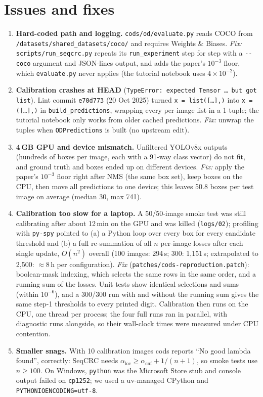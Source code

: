 \documentclass[10pt]{article}
\begin{document}
\section{Issues and fixes}
\begin{enumerate}
\item \textbf{Hard-coded path and logging.} \texttt{cods/od/evaluate.py} reads COCO from
\texttt{/datasets/shared\_datasets/coco/} and requires Weights \& Biases. \emph{Fix:} \texttt{scripts/run\_seqcrc.py}
repeats its \texttt{run\_experiment} step for step with a \texttt{-{}-coco} argument and JSON-lines output, and adds the
paper's $10^{-3}$ floor, which \texttt{evaluate.py} never applies (the tutorial notebook uses $4\times10^{-2}$).
\item \textbf{Calibration crashes at HEAD} (\texttt{TypeError: expected Tensor \dots\ but got list}). Lint commit
\texttt{e70d773} (20 Oct 2025) turned \texttt{x = list([\dots],)} into \texttt{x = ([\dots],)} in
\texttt{build\_predictions}, wrapping every per-image list in a 1-tuple; the tutorial notebook only works from older
cached predictions. \emph{Fix:} unwrap the tuples when \texttt{ODPredictions} is built (no upstream edit).
\item \textbf{4\,GB GPU and device mismatch.} Unfiltered YOLOv8x outputs (hundreds of boxes per image, each with a
91-way class vector) do not fit, and ground truth and boxes ended up on different devices. \emph{Fix:} apply the
paper's $10^{-3}$ floor right after NMS (the same box set), keep boxes on the CPU, then move all predictions to one
device; this leaves 50.8 boxes per test image on average (median 30, max 741).
\item \textbf{Calibration too slow for a laptop.} A 50/50-image smoke test was still calibrating after about 12\,min on
the GPU and was killed (\texttt{logs/02}); profiling with \texttt{py-spy} pointed to (a) a
Python loop over every box for every candidate threshold and (b) a full re-summation of all $n$ per-image losses after
each single update, $O(n^2)$ overall (100 images: 294\,s; 300: 1,151\,s; extrapolated to 2,500: $\approx$8\,h per
configuration). \emph{Fix} (\texttt{patches/cods-reproduction.patch}): boolean-mask indexing, which selects the same
rows in the same order, and a running sum of the losses. Unit tests show identical selections and sums (within
$10^{-6}$), and a 300/300 run with and without the running sum gives the same step-1 thresholds to every printed
digit. Calibration then runs on the CPU,
one thread per process; the four full runs ran in parallel, with diagnostic runs alongside, so their wall-clock times
were measured under CPU contention.
\item \textbf{Smaller snags.} With 10 calibration images cods reports ``No good lambda found'', correctly: SeqCRC
needs $\alpha_{\text{loc}}\ge\alpha_{\text{cnf}}+1/(n+1)$, so smoke tests use $n\ge100$. On Windows, \texttt{python}
was the Microsoft Store stub and console output failed on \texttt{cp1252}; we used a uv-managed CPython and
\texttt{PYTHONIOENCODING=utf-8}.
\end{enumerate}
\end{document}

